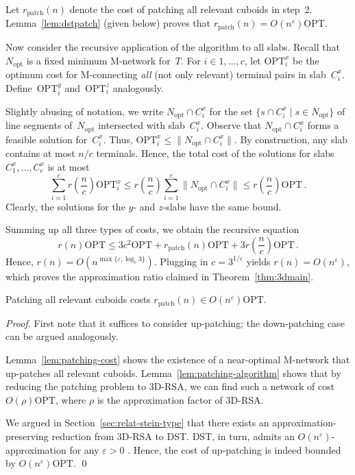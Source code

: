 \documentclass[11pt]{llncs}
\newcommand{\Nopt}{\ensuremath{N_\mathrm{opt}}\xspace}
\newcommand{\eps}{\ensuremath{\varepsilon}\xspace}
\newcommand{\opt}{\ensuremath{\mathrm{OPT}}\xspace}
\newcommand{\rpatch}{\ensuremath{r_\mathrm{patch}}}
\newenvironment{pf}{\begin{proof}}{\qed\end{proof}}
\begin{document}
Let $\rpatch(n)$ denote the cost of patching all relevant
cuboids in step~2.  Lemma~\ref{lem:dstpatch} (given below) proves that
$\rpatch(n) = O(n^{\eps})\opt$.

Now consider the recursive application of the algorithm to all slabs.
Recall that $\Nopt$ is a fixed minimum M-network for~$T$.  For $i \in
{1,\ldots,c}$, let $\opt_i^x$ be the optimum cost for M-connecting \emph{all}
(not only relevant) terminal pairs in slab~$C_i^x$. Define~$\opt_i^y$
and~$\opt_i^z$ analogously. 

Slightly abusing of notation, we write $\Nopt\cap C_i^x$ for the set
$\{ s \cap C_i^x \mid s \in \Nopt\}$
of line segments of~\Nopt intersected with
slab~$C_i^x$.  Observe that $\Nopt\cap C_i^x$ forms a feasible
solution for~$C_i^x$.  Thus, $\opt_i^x\leq \|\Nopt\cap C_i^x\|$.  By
construction, any slab contains at most $n/c$ terminals.  Hence, the
total cost of the solutions for slabs $C_1^x,\dots,C_c^x$ is at most
\begin{displaymath}
  \sum_{i=1}^cr\left(\frac{n}{c}\right)\opt_i^x\leq
  r\left(\frac{n}{c}\right)\sum_{i=1}^c\|\Nopt\cap C_i^x\|\leq
  r\left(\frac{n}{c}\right)\opt\,.
\end{displaymath}
Clearly, the solutions for the $y$- and $z$-slabs have the same bound.

Summing up all three types of costs, we obtain the recursive equation
\begin{displaymath}
  r(n)\opt\le 3c^2\opt+\rpatch(n)\opt+3r\left(\frac{n}{c}\right)\opt\,.
\end{displaymath}
Hence, $r(n)=O(n^{\max\{\eps,\log_c3\}})$.  Plugging in $c =
3^{1/\eps}$ yields $r(n)=O(n^\eps)$, which proves the approximation
ratio claimed in Theorem~\ref{thm:3dmain}.

\begin{lemma}
  \label{lem:dstpatch} 
Patching all relevant cuboids costs $\rpatch(n) \in O(n^{\eps})\opt$.
\end{lemma}

\begin{pf}
  First note that it suffices to consider up-patching; the
  down-patching case can be argued analogously. 

  Lemma~\ref{lem:patching-cost} shows the existence of a near-optimal
  M-network that up-patches all relevant cuboids.
  Lemma~\ref{lem:patching-algorithm} shows that by reducing the
  patching problem to 3D-RSA, we can find such a network of cost
  $O(\rho)\opt$, where $\rho$ is the approximation factor of 3D-RSA.

  We argued in Section~\ref{sec:relat-stein-type} that there exists an
  approximation-preserving reduction from 3D-RSA to DST.  DST, in
  turn, admits an $O(n^\eps)$-approximation for any $\eps>0$
  \cite{cccdggl-aadsp-98}.  Hence, the cost of up-patching is indeed
  bounded by $O(n^\eps)\opt$.
\end{pf}
\end{document}
